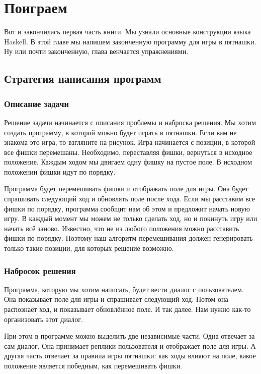 \chapter{Поиграем}

Вот и закончилась первая часть книги. Мы узнали основные конструкции
языка Haskell. В этой главе мы напишем законченную программу для игры в
пятнашки. Ну или почти законченную, глава венчается упражнениями.

\section{Стратегия написания программ}

\subsection{Описание задачи}

Решение задачи начинается с описания проблемы и наброска решения. Мы
хотим создать программу, в которой можно будет играть в пятнашки. Если
вам не знакома это игра, то взгляните на рисунок. Игра начинается с
позиции, в которой все фишки перемешаны. Необходимо, переставляя фишки,
вернуться в исходное положение. Каждым ходом мы двигаем одну фишку на
пустое поле. В исходном положении фишки идут по порядку.


Программа будет перемешивать фишки и отображать поле для игры. Она будет
спрашивать следующий ход и обновлять поле после хода. Если мы расставим
все фишки по порядку, программа сообщит нам об этом и предложит начать
новую игру. В каждый момент мы можем не только сделать ход, но и
покинуть игру или начать всё заново. Известно, что не из любого
положения можно расставить фишки по порядку. Поэтому наш алгоритм
перемешивания должен генерировать только такие позиции, для которых
решение возможно.

\subsection{Набросок решения}

Программа, которую мы хотим написать, будет вести диалог с
пользователем. Она показывает поле для игры и спрашивает следующий ход.
Потом она распознаёт ход, и показывает обновлённое поле. И так далее.
Нам нужно как-то организовать этот диалог.

При этом в программе можно выделить две независимые части. Одна отвечает
за сам диалог. Она принимает реплики пользователя и отображает поле для
игры. А другая часть отвечает за правила игры пятнашки: как ходы влияют
на поле, какое положение является победным, как перемешивать фишки.

